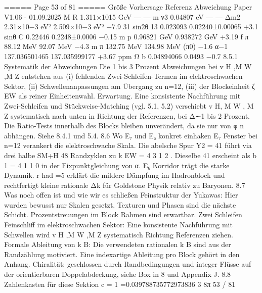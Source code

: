 \begin{MyVerbatim}
{{===== Page 53 of 81 =====
Größe Vorhersage Referenz Abweichung
Paper V1.06 - 01.09.2025
M R 1.311×1015 GeV — —
m ν3 0.04807 eV — —
Δm2 2.31×10−3 eV² 2.509×10−3 eV² −7.9 %
31
sin2θ 13 0.023093 0.02240±0.00065 +3.1 %
sinθ C 0.22446 0.2248±0.0006 −0.15 %
m p 0.96821 GeV 0.938272 GeV +3.19 %
f π 88.12 MeV 92.07 MeV −4.3 %
m π 132.75 MeV 134.98 MeV (π0) −1.6 %
α−1 137.036501465 137.035999177 +3.67 ppm
Ω b 0.04894066 0.0493 −0.7 %
8.5.1 Systematik der Abweichungen
Die 1 bis 3 Prozent Abweichungen bei v H ,M W ,M Z entstehen aus
(i) fehlenden Zwei-Schleifen-Termen im elektroschwachen Sektor,
(ii) Schwellenanpassungen am Übergang zu n=12,
(iii) der Blockeinheit ζ EW als reiner Einheitenwahl.
Erwartung. Eine konsistente Nachführung mit Zwei-Schleifen und Stückweise-Matching (vgl. 5.1, 5.2) verschiebt v H, M W
, M Z systematisch nach unten in Richtung der Referenzen, bei Δ∼1 bis 2 Prozent. Die Ratio-Tests innerhalb des
Blocks bleiben unverändert, da sie nur von φ n abhängen. Siehe 8.4.1 und 5.4.
8.6 Wo E₇ und E₆ konkret einhaken
E₇ Fenster bei n=12 verankert die elektroschwache Skala. Die abelsche Spur Y2 = 41 führt via drei halbe
SM+H 48
Randzyklen zu k EW = 4 3 1 2 . Dieselbe 41 erscheint als b 1 = 4 1 1 0 in der Fixpunktgleichung von α.
E₆ Korridor trägt die starke Dynamik. r had =5 erklärt die mildere Dämpfung im Hadronblock und rechtfertigt kleine
rationale Δk für Goldstone Physik relativ zu Baryonen.
8.7 Was noch offen ist und wie wir es schließen
Feinstruktur der Yukawas: Hier wurden bewusst nur Skalen gesetzt. Texturen und Phasen sind die nächste
Schicht. Prozentstreuungen im Block Rahmen sind erwartbar.
Zwei Schleifen Feinschliff im elektroschwachen Sektor: Eine konsistente Nachführung mit Schwellen wird
v H ,M W ,M Z systematisch Richtung Referenzen ziehen.
Formale Ableitung von k B: Die verwendeten rationalen k B sind aus der Randzählung motiviert. Eine indexartige
Ableitung pro Block gehört in den Anhang.
Chiralität: geschlossen durch Randbedingungen und integer Flüsse auf der orientierbaren Doppelabdeckung, siehe
Box in 8 und Appendix J.
8.8 Zahlenkasten für diese Sektion
c = 1 =0.039788735772973836
3 8π 53 / 81

}}
\end{MyVerbatim}
